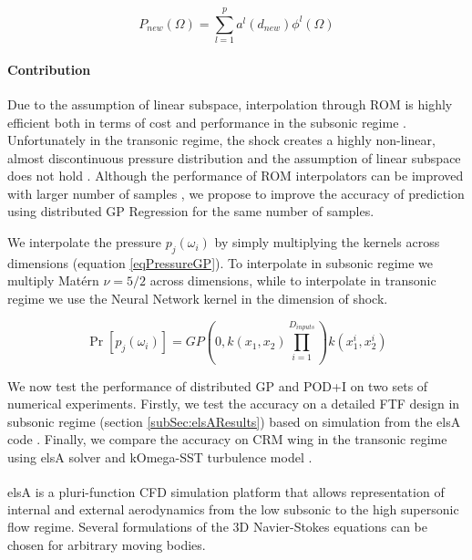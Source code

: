 \begin{equation}\label{eq:interpPODEquation}
P_{new}(\Omega) = \sum_{l=1}^{p}a^{l}(d_{new}) \phi^{l}(\Omega)
\end{equation}

\begin{mdframed}[hidealllines=true,backgroundcolor=blue!20]
\paragraph{Contribution}
Due to the assumption of linear subspace, interpolation through ROM is highly efficient both in terms of cost and performance in the subsonic regime \cite{verveld2016reduced}. Unfortunately in the transonic regime, the shock creates a highly non-linear, almost discontinuous pressure distribution and the assumption of linear subspace does not hold \cite{li2016performance}. Although the performance of ROM interpolators can be improved with larger number of samples \cite{franz2014interpolation, forrester2008engineering}, we propose to improve the accuracy of prediction using distributed GP Regression for the same number of samples.  

We interpolate the pressure $p_{j}(\omega_{i})$ by simply multiplying the kernels across dimensions (equation \ref{eqPressureGP}). To interpolate in subsonic regime we multiply Mat\'ern $\nu=5/2$ across dimensions, while to interpolate in transonic regime we use the Neural Network kernel in the dimension of shock.

\begin{equation}\label{eqPressureGP}
\Pr[p_{j}(\omega_{i})] = GP(0, k(x_{1}, x_{2})\prod_{i=1}^{D_{inputs}}) k(x_{1}^{i}, x_{2}^{i})
\end{equation}
\end{mdframed}

We now test the performance of distributed GP and POD+I on two sets of numerical experiments. Firstly, we test the accuracy on a detailed FTF design \cite{Bosco2016} in subsonic regime (section \ref{subSec:elsAResults}) based on simulation from the elsA code \cite{cambier2008status}. Finally, we compare the accuracy on CRM wing in the transonic regime using elsA solver and kOmega-SST turbulence model \cite{vassberg2014summary}. 

elsA\textsuperscript{\textregistered} \cite{cambier2008status} is a pluri-function CFD simulation platform that allows representation of internal and external aerodynamics from the low subsonic to the high supersonic flow regime. Several formulations of the 3D Navier-Stokes equations can be chosen for arbitrary moving bodies. 

